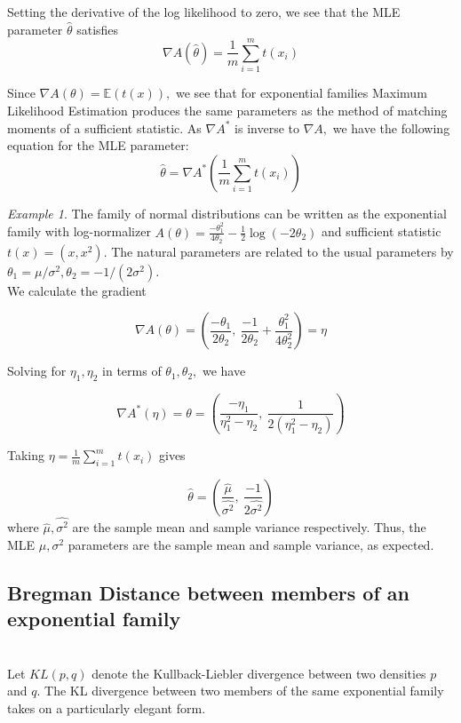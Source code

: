 \documentclass[BSc]{usydthesis}
\numberwithin{equation}{chapter}
\theoremstyle{remark}
\newtheorem{Example}[equation]{Example}
\begin{document}
Setting the derivative of the log likelihood to zero, we see that the MLE parameter $\hat{\theta}$ satisfies $$\nabla A(\hat{\theta}) = \frac{1}{m}\sum_{i=1}^m t(x_i)$$

Since $\nabla A(\theta) = \mathbb{E}(t(x)),$ we see that for exponential families Maximum Likelihood Estimation produces the same parameters as the method of matching moments of a sufficient statistic. As $\nabla A^*$ is inverse to $\nabla A,$ we have the following equation for the MLE parameter:
$$ \hat{\theta} = \nabla A^*\left(\frac{1}{m}\sum_{i=1}^m t(x_i) \right)$$

\begin{Example}
 The family of normal distributions can be written as the exponential family with log-normalizer $A(\theta) = \frac{-\theta_1^2}{4\theta_2} - \frac{1}{2} \log(-2\theta_2)$ and sufficient statistic $t(x) = (x,x^2).$ The natural parameters are related to the usual parameters by $\theta_1 = \mu/\sigma^2, \theta_2 = -1/(2\sigma^2).$\\
 
 We calculate the gradient 
 
 $$ \nabla A(\theta) = \left(
    \frac{-\theta_1}{2\theta_2}, \ 
    \frac{-1}{2\theta_2} + \frac{\theta_1^2}{4\theta_2^2} \right) = \eta$$

Solving for $\eta_1, \eta_2$ in terms of $\theta_1, \theta_2,$ we have 

$$ \nabla A^*(\eta) = \theta = \left(
    \frac{-\eta_1}{\eta_1^2- \eta_2}, \
    \frac{1}{2(\eta_1^2-\eta_2)}  \right)$$

Taking $\eta = \frac{1}{m}\sum_{i=1}^m t(x_i)$ gives 

$$ \hat{\theta} = \left(
    \frac{\hat{\mu}}{\hat{\sigma^2}}, \
    \frac{-1}{2\hat{\sigma^2}}  \right)$$
where $\hat{\mu}, \hat{\sigma^2}$ are the sample mean and sample variance respectively. Thus, the MLE $\mu, \sigma^2$ parameters are the sample mean and sample variance, as expected.
\end{Example}

\subsection{Bregman Distance between members of an exponential family} \ \\
Let $KL(p,q)$ denote the Kullback-Liebler divergence between two densities $p$ and $q.$ The KL divergence between two members of the same exponential family takes on a particularly elegant form.
\end{document}
